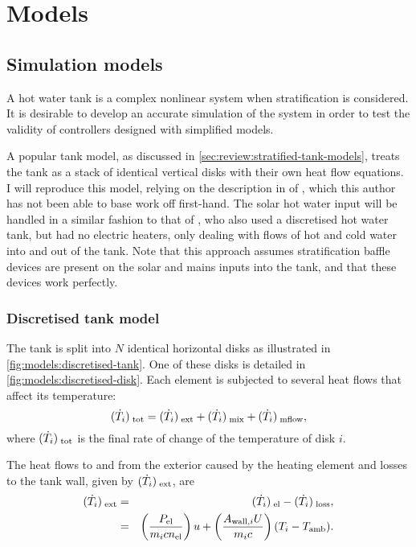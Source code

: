 \chapter{Models}

\section{Simulation models}

A hot water tank is a complex nonlinear system when stratification is considered.
It is desirable to develop an accurate simulation of the system in order to test the validity of controllers designed with simplified models.

A popular tank model, as discussed in \autoref{sec:review:stratified-tank-models}, treats the tank as a stack of identical vertical disks with their own heat flow equations.
I will reproduce this model, relying on the description in \textcite{Pfeiffer11} of \textcite{Koch11}, which this author has not been able to base work off first-hand.
The solar hot water input will be handled in a similar fashion to that of \textcite{Cristofari02}, who also used a discretised hot water tank, but had no electric heaters, only dealing with flows of hot and cold water into and out of the tank.
Note that this approach assumes stratification baffle devices are present on the solar and mains inputs into the tank, and that these devices work perfectly.

\subsection{Discretised tank model}

The tank is split into $N$ identical horizontal disks as illustrated in \autoref{fig:models:discretised-tank}.
One of these disks is detailed in \autoref{fig:models:discretised-disk}.
Each element is subjected to several heat flows that affect its temperature:
\begin{equation}
	\label{eq:flow-total}
	(\dot{T}_{i})_{\;\text{tot}} = (\dot{T}_{i})_{\;\text{ext}} + (\dot{T}_{i})_{\;\text{mix}} + (\dot{T}_{i})_{\;\text{mflow}},
\end{equation}
where $(\dot{T}_{i})_{\;\text{tot}}$ is the final rate of change of the temperature of disk $i$.

The heat flows to and from the exterior caused by the heating element and losses to the tank wall, given by $(\dot{T}_{i})_{\;\text{ext}}$, are
\begin{eqnarray}
	\label{eq:flow-ext}
	(\dot{T}_{i})_{\;\text{ext}} &=& (\dot{T}_{i})_{\;\text{el}} - (\dot{T}_{i})_{\;\text{loss}}, \nonumber\\
	           &=& \left(\frac{P_{\text{el}}}{m_i c n_{\text{el}}}\right) u
	             + \left(\frac{A_{\text{wall}, i} U}{m_i c}\right) (T_i - T_{\text{amb}}).
\end{eqnarray}

